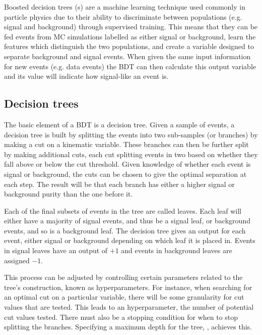 
Boosted decision trees ({}s) are a machine learning technique used
commonly in particle physics due to their ability to discriminate between
populations (e.g. signal and background) through supervised training. This means
that they can be fed events from \ac{MC} simulations labelled as either signal
or background, learn the features which distinguish the two populations, and
create a
variable designed to separate background and signal events. When given the same
input information for new events (e.g. data events) the \ac{BDT} can then
calculate this output variable and its value will indicate how signal-like an
event is.


\subsection{Decision trees}
\label{sec:methods-bdt-trees}

The basic element of a \ac{BDT} is a decision tree. Given a sample of events, a
decision tree is built by splitting the events into two sub-samples (or
branches) by making a cut on a kinematic variable. These branches can then be
further split by making additional cuts, each cut splitting events in two based
on whether they fall above or below the cut threshold. Given knowledge of
whether each event is signal or background, the cuts can be chosen to give the
optimal separation at each step. The result will be that each branch has either
a higher signal or background purity than the one before it.

Each of the final subsets of events in the tree are called leaves. Each leaf
will either have a majority of signal events, and thus be a signal leaf, or
background events, and so is a background leaf. The decision tree gives an
output for each event, either signal or background depending on which leaf it is
placed in. Events in signal leaves have an output of $+1$ and events in
background leaves are assigned $-1$.

This process can be adjusted by controlling certain parameters related to the
tree's construction, known as hyperparameters. For instance, when searching for
an optimal cut on a particular variable, there will be some granularity for cut
values that are tested. This leads to an \ncuts hyperparameter, the number of
potential cut values tested. There must also be a stopping condition for when to
stop splitting the branches. Specifying a maximum depth for the tree, \dmax,
achieves this.

